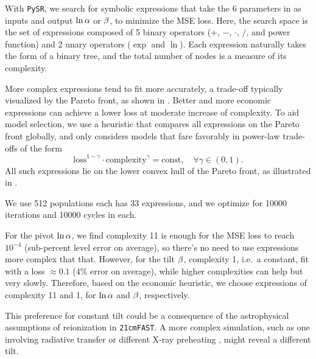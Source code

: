With \texttt{PySR}, we search for symbolic expressions that take the 6
parameters in  as inputs and output $\ln\alpha$ or $\beta$,
to minimize the MSE loss.
Here, the search space is the set of expressions composed of 5 binary
operators ($+$, $-$, $\cdot$, $/$, and power function) and 2 unary
operators ($\exp$ and $\ln$).
Each expression naturally takes the form of a binary tree, and the
total number of nodes is a measure of its complexity.

More complex expressions tend to fit more accurately, a trade-off
typically visualized by the Pareto front, as shown in .
Better and more economic expressions can achieve a lower loss at
moderate increase of complexity.
To aid model selection, we use a heuristic that compares all expressions
on the Pareto front globally, and only considers models that fare
favorably in power-law trade-offs of the form
%
\begin{equation}
\mathrm{loss}^{1 - \gamma} \cdot \mathrm{complexity}^\gamma
= \mathrm{const}, \quad \forall \gamma \in (0, 1).
\end{equation}
All such expressions lie on the lower convex hull of the Pareto front,
as illustrated in .

We use 512 populations each has 33 expressions, and we optimize for
10000 iterations and 10000 cycles in each.

For the pivot $\ln\alpha$, we find complexity 11 is enough for the MSE loss
to reach $10^{-4}$ (sub-percent level error on average), so there's no
need to use expressions more complex that that.
However, for the tilt $\beta$, complexity 1, i.e.\ a constant, fit with
a loss $\approx 0.1$ ($4\%$ error on average), while higher complexities
can help but very slowly.
Therefore, based on the economic heuristic, we choose expressions of
complexity 11 and 1, for $\ln\alpha$ and $\beta$, respectively.

This preference for constant tilt could be a consequence of the
astrophysical assumptions of reionization in \texttt{21cmFAST}.
A more complex simulation, such as one involving radiative transfer or
different X-ray preheating \cite{Montero2024}, might reveal a different
tilt.



